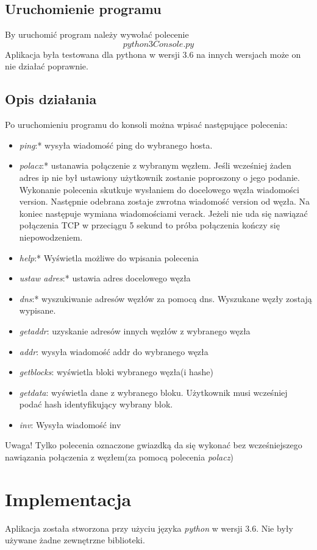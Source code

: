 \subsection{Uruchomienie programu}
By uruchomić program należy wywołać polecenie $$python3 Console.py$$
Aplikacja była testowana dla pythona w wersji 3.6 na innych wersjach może on nie działać poprawnie.
\subsection{Opis działania}

Po uruchomieniu programu do konsoli można wpisać następujące polecenia:
\begin{itemize}
\item \textit{ping}:* wysyła wiadomość ping do wybranego hosta.
\item \textit{polacz}:* ustanawia połączenie z wybranym węzłem. Jeśli wcześniej żaden adres ip nie był ustawiony użytkownik zostanie poproszony o jego podanie. Wykonanie polecenia skutkuje wysłaniem do docelowego węzła wiadomości version. Następnie odebrana zostaje zwrotna wiadomość version od węzła. Na koniec następuje wymiana wiadomościami verack. Jeżeli nie uda się nawiązać połączenia TCP w przeciągu 5 sekund to próba połączenia kończy się niepowodzeniem.
\item \textit{help}:* Wyświetla możliwe do wpisania polecenia
\item \textit{ustaw adres}:* ustawia adres docelowego węzła
\item \textit{dns}:* wyszukiwanie adresów węzłów za pomocą dns. Wyszukane węzły zostają wypisane.
\item \textit{getaddr}: uzyskanie adresów innych węzłów z wybranego węzła
\item \textit{addr}: wysyła wiadomość addr do wybranego węzła
\item \textit{getblocks}: wyświetla bloki wybranego węzła(i hashe)
\item \textit{getdata}:  wyświetla dane z wybranego bloku. Użytkownik musi wcześniej podać hash identyfikujący wybrany blok.
\item \textit{inv}: Wysyła wiadomość inv
\end{itemize}

Uwaga! Tylko polecenia oznaczone gwiazdką da się wykonać bez wcześniejszego nawiązania połączenia z węzłem(za pomocą polecenia \textit{polacz})

\section{Implementacja}
Aplikacja została stworzona przy użyciu języka \textit{python} w wersji 3.6. Nie były używane żadne zewnętrzne biblioteki.



